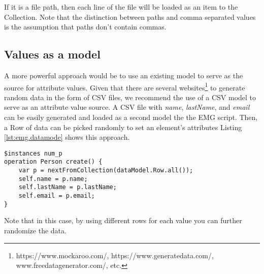 If it is a file path, then each line of the file will be loaded as an item to the Collection. Note that the distinction between paths and comma separated values is the assumption that paths don't contain commas.

\subsection{Values as a model}
A more powerful approach would be to use an existing model to serve as the source for attribute values. Given that there are several websites\footnote{https://www.mockaroo.com/, https://www.generatedata.com/, www.freedatagenerator.com/, etc.} to generate random data in the form of CSV files, we recommend the use of a CSV model to serve as an attribute value source. A CSV file with \emph{name}, \emph{lastName}, and \emph{email} can be easily generated and loaded as a second model the the EMG script. Then, a Row of data can be picked randomly to set an element's attributes Listing \ref{lst:emg.datamode} shows this approach.

\begin{lstlisting}[float=h, caption={EMG create operations}, label=lst:emg.datamode, language=EOL]
$instances num_p
operation Person create() {
    var p = nextFromCollection(dataModel.Row.all());
    self.name = p.name;
    self.lastName = p.lastName;
    self.email = p.email;
}
\end{lstlisting}

Note that in this case, by using different rows for each value you can further randomize the data.

